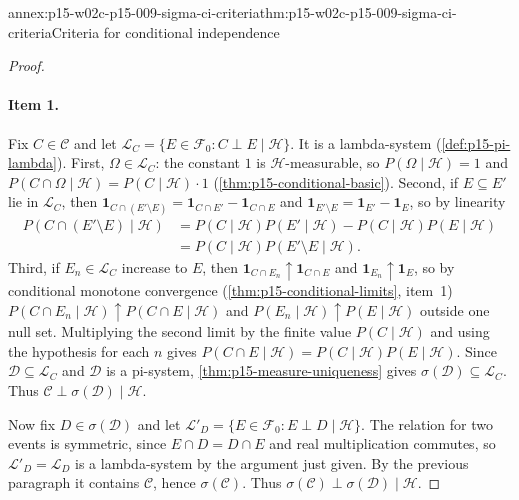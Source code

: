 \begin{annexitem}{annex:p15-w02c-p15-009-sigma-ci-criteria}{thm:p15-w02c-p15-009-sigma-ci-criteria}{Criteria for conditional independence}
\begin{proof}
\paragraph{Item 1.} Fix \(C\in\mathcal C\) and let
\(\mathcal L_C=\{E\in\mathcal F_0:C\perp E\mid\mathcal H\}\). It is a
lambda-system (\cref{def:p15-pi-lambda}).
First, \(\Omega\in\mathcal L_C\): the constant \(1\) is
\(\mathcal H\)-measurable, so \(P(\Omega\mid\mathcal H)=1\) and
\(P(C\cap\Omega\mid\mathcal H)=P(C\mid\mathcal H)\cdot1\)
(\cref{thm:p15-conditional-basic}).
Second, if \(E\subseteq E'\) lie in \(\mathcal L_C\), then
\(\mathbf1_{C\cap(E'\setminus E)}=\mathbf1_{C\cap E'}-\mathbf1_{C\cap E}\) and
\(\mathbf1_{E'\setminus E}=\mathbf1_{E'}-\mathbf1_E\), so by linearity
\[
\begin{aligned}
 P(C\cap(E'\setminus E)\mid\mathcal H)
 &=P(C\mid\mathcal H)P(E'\mid\mathcal H)-P(C\mid\mathcal H)P(E\mid\mathcal H)\\
 &=P(C\mid\mathcal H)P(E'\setminus E\mid\mathcal H).
\end{aligned}
\]
Third, if \(E_n\in\mathcal L_C\) increase to \(E\), then
\(\mathbf1_{C\cap E_n}\uparrow\mathbf1_{C\cap E}\) and
\(\mathbf1_{E_n}\uparrow\mathbf1_E\), so by conditional monotone
convergence (\cref{thm:p15-conditional-limits}, item~1)
\(P(C\cap E_n\mid\mathcal H)\uparrow P(C\cap E\mid\mathcal H)\) and
\(P(E_n\mid\mathcal H)\uparrow P(E\mid\mathcal H)\) outside one null set.
Multiplying the second limit by the finite value \(P(C\mid\mathcal H)\)
and using the hypothesis for each \(n\) gives
\(P(C\cap E\mid\mathcal H)=P(C\mid\mathcal H)P(E\mid\mathcal H)\).
Since \(\mathcal D\subseteq\mathcal L_C\) and \(\mathcal D\) is a
pi-system, \cref{thm:p15-measure-uniqueness} gives
\(\sigma(\mathcal D)\subseteq\mathcal L_C\). Thus
\(\mathcal C\perp\sigma(\mathcal D)\mid\mathcal H\).

Now fix \(D\in\sigma(\mathcal D)\) and let
\(\mathcal L'_D=\{E\in\mathcal F_0:E\perp D\mid\mathcal H\}\). The relation
for two events is symmetric, since \(E\cap D=D\cap E\) and real
multiplication commutes, so \(\mathcal L'_D=\mathcal L_D\) is a
lambda-system by the argument just given. By the previous paragraph it
contains \(\mathcal C\), hence \(\sigma(\mathcal C)\). Thus
\(\sigma(\mathcal C)\perp\sigma(\mathcal D)\mid\mathcal H\).


\end{proof}
\end{annexitem}
